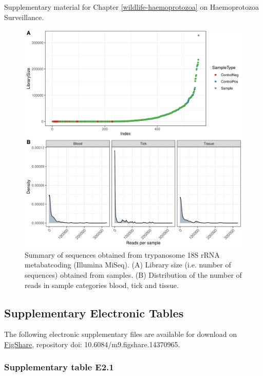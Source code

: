 \documentclass[a4paper, nobind]{templates/ociamthesis}
\begin{document}
Supplementary material for Chapter \ref{wildlife-haemoprotozoa} on Haemoprotozoa Surveillance.

\begin{figure}[h]
\includegraphics[width=0.95\linewidth]{figures/ms-figs-appendix/FigA-4.1} \caption[Sequence summary of trypanosome metabarcoding]{Summary of sequences obtained from trypanosome 18S rRNA metabatcoding (Illumina MiSeq). (A) Library size (i.e. number of sequences) obtained from samples. (B) Distribution of the number of reads in sample categories blood, tick and tissue.}\label{fig:FA41}
\end{figure}

\clearpage

\hypertarget{ch4-esupp}{%
\subsection{Supplementary Electronic Tables}\label{ch4-esupp}}

The following electronic supplementary files are available for download on \href{https://figshare.com/s/9eb3dba4096470af9904}{FigShare}, repository doi: 10.6084/m9.figshare.14370965.

\hypertarget{supplementary-table-e2.1}{%
\subsubsection{Supplementary table E2.1}\label{supplementary-table-e2.1}}
\end{document}
